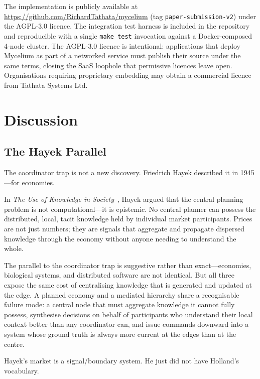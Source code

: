 \documentclass[11pt]{article}
\begin{document}
The implementation is publicly available at
\url{https://github.com/RichardTathata/mycelium} (tag \texttt{paper-submission-v2}) under the AGPL-3.0 licence.
The integration test harness is included in the repository and reproducible with a
single \texttt{make test} invocation against a Docker-composed 4-node cluster.
The AGPL-3.0 licence is intentional: applications that deploy Mycelium as part of a
networked service must publish their source under the same terms, closing the
SaaS loophole that permissive licences leave open. Organisations requiring
proprietary embedding may obtain a commercial licence from Tathata Systems Ltd.

\section{Discussion}

\subsection{The Hayek Parallel}

The coordinator trap is not a new discovery. Friedrich Hayek described it in
1945---for economies.

In \emph{The Use of Knowledge in Society}~\cite{hayek}, Hayek argued that the
central planning problem is not computational---it is epistemic. No central
planner can possess the distributed, local, tacit knowledge held by individual
market participants. Prices are not just numbers; they are signals that aggregate
and propagate dispersed knowledge through the economy without anyone needing to
understand the whole.

The parallel to the coordinator trap is suggestive rather than exact---economies,
biological systems, and distributed software are not identical. But all three
expose the same cost of centralising knowledge that is generated and updated at
the edge. A planned economy and a mediated hierarchy share a recognisable failure
mode: a central node that must aggregate knowledge it cannot fully possess,
synthesise decisions on behalf of participants who understand their local context
better than any coordinator can, and issue commands downward into a system whose
ground truth is always more current at the edges than at the centre.

Hayek's market is a signal/boundary system. He just did not have Holland's
vocabulary.
\end{document}
